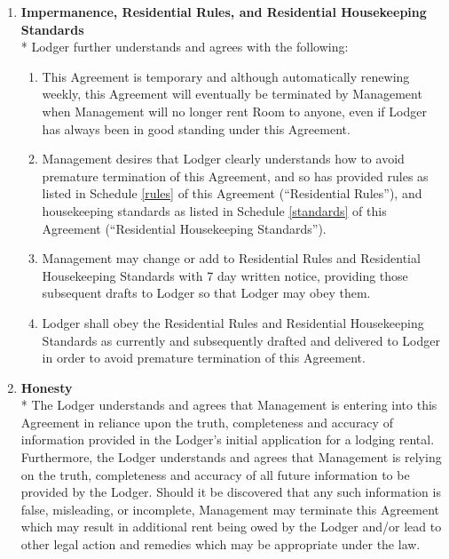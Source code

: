 \documentclass[12pt,letterpaper]{article}
\newcommand{\lodger}{Lodger}
\newcommand{\rules}{Residential Rules}
\newcommand{\standards}{Residential Housekeeping Standards}
\newcommand{\management}{Management}
\newcommand{\room}{Room}
\begin{document}
\begin{enumerate}
		\item \textbf{Impermanence, \rules{}, and \standards{}}\\*
			\lodger{} further understands and agrees with the following: 
			\begin{enumerate}
				\item This Agreement is temporary and although automatically renewing weekly, this Agreement will eventually be terminated by \management{} when \management{} will no longer rent \room{} to anyone, even if \lodger{} has always been in good standing under this Agreement. 
				\item \management{} desires that \lodger{} clearly understands how to avoid premature termination of this Agreement, and so has provided rules as listed in Schedule \ref{rules} of this Agreement (``\rules{}''), and housekeeping standards as listed in Schedule \ref{standards} of this Agreement (``\standards{}''). 
				\item \management{} may change or add to \rules{} and \standards{} with 7 day written notice, providing those subsequent drafts to \lodger{} so that \lodger{} may obey them. 
				\item \lodger{} shall obey the \rules{} and \standards{} as currently and subsequently drafted and delivered to \lodger{} in order to avoid premature termination of this Agreement.
			\end{enumerate}

		\item \textbf{Honesty}\\*
			The \lodger{} understands and agrees that \management{} is entering into this Agreement in reliance upon the truth, completeness and accuracy of information provided in the \lodger{}'s initial application for a lodging rental. Furthermore, the \lodger{} understands and agrees that \management{} is relying on the truth, completeness and accuracy of all future information to be provided by the \lodger{}. Should it be discovered that any such information is false, misleading, or incomplete, \management{} may terminate this Agreement which may result in additional rent being owed by the \lodger{} and/or lead to other legal action and remedies which may be appropriate under the law. 

	\end{enumerate}
\end{document}
